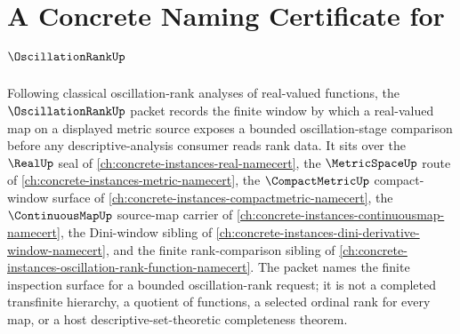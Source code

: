 \chapter{A Concrete Naming Certificate for $\OscillationRankUp$}
\label{ch:concrete-instances-oscillation-rank-namecert}

Following classical oscillation-rank analyses of real-valued functions, the $\OscillationRankUp$ packet records the finite window by which a real-valued map on a displayed metric source exposes a bounded oscillation-stage comparison before any descriptive-analysis consumer reads rank data. It sits over the $\RealUp$ seal of \autoref{ch:concrete-instances-real-namecert}, the $\MetricSpaceUp$ route of \autoref{ch:concrete-instances-metric-namecert}, the $\CompactMetricUp$ compact-window surface of \autoref{ch:concrete-instances-compactmetric-namecert}, the $\ContinuousMapUp$ source-map carrier of \autoref{ch:concrete-instances-continuousmap-namecert}, the Dini-window sibling of \autoref{ch:concrete-instances-dini-derivative-window-namecert}, and the finite rank-comparison sibling of \autoref{ch:concrete-instances-oscillation-rank-function-namecert}. The packet names the finite inspection surface for a bounded oscillation-rank request; it is not a completed transfinite hierarchy, a quotient of functions, a selected ordinal rank for every map, or a host descriptive-set-theoretic completeness theorem.

